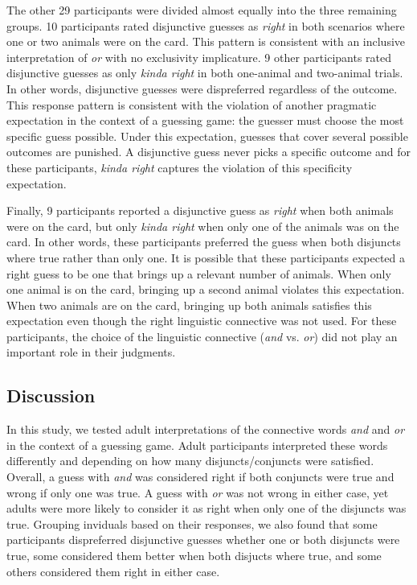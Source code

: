 \documentclass[10pt, letterpaper]{article}
\begin{document}
The other 29 participants were divided almost equally into the three
remaining groups. 10 participants rated disjunctive guesses as
\emph{right} in both scenarios where one or two animals were on the
card. This pattern is consistent with an inclusive interpretation of
\emph{or} with no exclusivity implicature. 9 other participants rated
disjunctive guesses as only \emph{kinda right} in both one-animal and
two-animal trials. In other words, disjunctive guesses were dispreferred
regardless of the outcome. This response pattern is consistent with the
violation of another pragmatic expectation in the context of a guessing
game: the guesser must choose the most specific guess possible. Under
this expectation, guesses that cover several possible outcomes are
punished. A disjunctive guess never picks a specific outcome and for
these participants, \emph{kinda right} captures the violation of this
specificity expectation.

Finally, 9 participants reported a disjunctive guess as \emph{right}
when both animals were on the card, but only \emph{kinda right} when
only one of the animals was on the card. In other words, these
participants preferred the guess when both disjuncts where true rather
than only one. It is possible that these participants expected a right
guess to be one that brings up a relevant number of animals. When only
one animal is on the card, bringing up a second animal violates this
expectation. When two animals are on the card, bringing up both animals
satisfies this expectation even though the right linguistic connective
was not used. For these participants, the choice of the linguistic
connective (\emph{and} vs. \emph{or}) did not play an important role in
their judgments.

\subsection{Discussion}\label{discussion}

In this study, we tested adult interpretations of the connective words
\emph{and} and \emph{or} in the context of a guessing game. Adult
participants interpreted these words differently and depending on how
many disjuncts/conjuncts were satisfied. Overall, a guess with
\emph{and} was considered right if both conjuncts were true and wrong if
only one was true. A guess with \emph{or} was not wrong in either case,
yet adults were more likely to consider it as right when only one of the
disjuncts was true. Grouping inviduals based on their responses, we also
found that some participants dispreferred disjunctive guesses whether
one or both disjuncts were true, some considered them better when both
disjucts where true, and some others considered them right in either
case.
\end{document}

